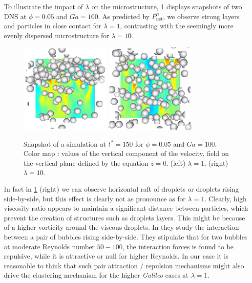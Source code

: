 To illustrate the impact of $\lambda$ on the microstructure, \ref{fig:images} displays snapshots of two DNS at $\phi = 0.05$ and $Ga = 100$. 
As predicted by $P_\text{nst}^n$, we observe strong layers and particles in close contact for $\lambda = 1$, contrasting with the seemingly more evenly dispersed microstructure for $\lambda = 10$.
\begin{figure}[h!]
    \centering
    \includegraphics[width=0.4\textwidth]{image/HOMOGENEOUS_NEW/P_PHI_5_l_10_Ga_100.png}
    \includegraphics[width=0.4\textwidth]{image/HOMOGENEOUS_NEW/P_PHI_5_l_1_Ga_100.png}
    \caption{Snapshot of a simulation at $t^* = 150$ for $\phi=0.05$ and $Ga=100$.
    Color map : values of the vertical component of the velocity, field on the vertical plane defined by the equation $z=0$. 
    (left)  $\lambda = 1$.
    (right)  $\lambda = 10$.
    }
    \label{fig:images}
\end{figure}
In fact in \ref{fig:images} (right) we can observe horizontal raft of droplets or droplets rising side-by-side, but this effect is clearly not as pronounce as for $\lambda = 1$. 
Clearly, high viscosity ratio appears to maintain a significant distance between particles, which prevent the creation of structures such as droplets layers.
This might be because of a higher vorticity around the viscous droplets.   
In \citet{legendre2003hydrodynamic} they study the interaction between a pair of bubbles rising side-by-side. 
They stipulate that for two bubbles at moderate Reynolds number $50-100$, the interaction forces is found to be repulsive, while it is attractive or null for higher Reynolds. 
In our case it is reasonable to think that such pair attraction / repulsion mechanisms might also drive the clustering mechanism for the higher \textit{Galileo} cases at $\lambda = 1$.


